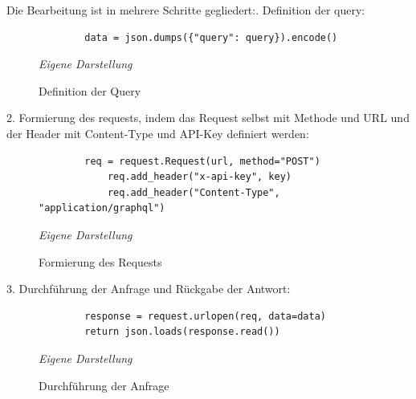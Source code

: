 	Die Bearbeitung ist in mehrere Schritte gegliedert:. Definition der query:\newline
		\begin{figure}[H]
		\centering
		\begin{minipage}[t]{.7\textwidth} %
		\caption{Definition der Query} %
		\begin{verbatim}
		data = json.dumps({"query": query}).encode()
		\end{verbatim}
		
		\textit{Eigene Darstellung} %
		\label{fig:queryDefinition}
		\end{minipage}
		\end{figure}
	2. Formierung des requests, indem das Request selbst mit Methode und URL und der Header mit Content-Type und API-Key definiert werden:\newline
		\begin{figure}[H]
		\centering
		\begin{minipage}[t]{.7\textwidth} %
		\caption{Formierung des Requests} %
		\begin{verbatim}
		req = request.Request(url, method="POST")
		    req.add_header("x-api-key", key)
		    req.add_header("Content-Type", "application/graphql")
		\end{verbatim}
		
		\textit{Eigene Darstellung} %
		\label{fig:requestFormierung}
		\end{minipage}
		\end{figure}
	3. Durchführung der Anfrage und Rückgabe der Antwort:\newline
		\begin{figure}[H]
		\centering
		\begin{minipage}[t]{.7\textwidth} %
		\caption{Durchführung der Anfrage} %
		\begin{verbatim}
		response = request.urlopen(req, data=data)
		return json.loads(response.read())
		\end{verbatim}
		
		\textit{Eigene Darstellung} %
		\label{fig:anfrageDurchführung}
		\end{minipage}
		\end{figure}
